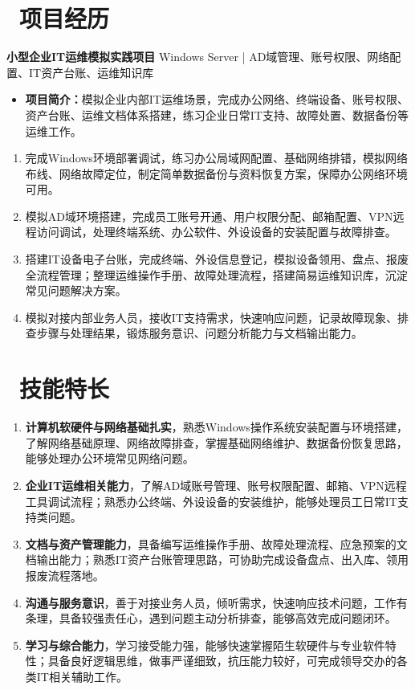 ﻿\documentclass[10pt,a4paper]{ctexart}
\newcommand{\sect}[2]{%
  \section{\texorpdfstring{\makebox[\widthof{\faGraduationCap}][c]{{\mdseries\color{themecolor}#1}}\ #2}{#2}}
}
\begin{document}
\sect{\faFileText}{项目经历}
\textbf{小型企业IT运维模拟实践项目}
Windows Server \quad | \quad AD域管理、账号权限、网络配置、IT资产台账、运维知识库
\begin{itemize}
  \item \textbf{项目简介：}模拟企业内部IT运维场景，完成办公网络、终端设备、账号权限、资产台账、运维文档体系搭建，练习企业日常IT支持、故障处置、数据备份等运维工作。
\end{itemize}
\begin{enumerate}
  \item 完成Windows环境部署调试，练习办公局域网配置、基础网络排错，模拟网络布线、网络故障定位，制定简单数据备份与资料恢复方案，保障办公网络环境可用。
  \item 模拟AD域环境搭建，完成员工账号开通、用户权限分配、邮箱配置、VPN远程访问调试，处理终端系统、办公软件、外设设备的安装配置与故障排查。
  \item 搭建IT设备电子台账，完成终端、外设信息登记，模拟设备领用、盘点、报废全流程管理；整理运维操作手册、故障处理流程，搭建简易运维知识库，沉淀常见问题解决方案。
  \item 模拟对接内部业务人员，接收IT支持需求，快速响应问题，记录故障现象、排查步骤与处理结果，锻炼服务意识、问题分析能力与文档输出能力。
\end{enumerate}

\sect{\faWrench}{技能特长}
\begin{enumerate}
  \item \textbf{计算机软硬件与网络基础扎实}，熟悉Windows操作系统安装配置与环境搭建，了解网络基础原理、网络故障排查，掌握基础网络维护、数据备份恢复思路，能够处理办公环境常见网络问题。
  \item \textbf{企业IT运维相关能力}，了解AD域账号管理、账号权限配置、邮箱、VPN远程工具调试流程；熟悉办公终端、外设设备的安装维护，能够处理员工日常IT支持类问题。
  \item \textbf{文档与资产管理能力}，具备编写运维操作手册、故障处理流程、应急预案的文档输出能力；熟悉IT资产台账管理思路，可协助完成设备盘点、出入库、领用报废流程落地。
  \item \textbf{沟通与服务意识}，善于对接业务人员，倾听需求，快速响应技术问题，工作有条理，具备较强责任心，遇到问题主动分析排查，能够高效完成问题闭环。
  \item \textbf{学习与综合能力}，学习接受能力强，能够快速掌握陌生软硬件与专业软件特性；具备良好逻辑思维，做事严谨细致，抗压能力较好，可完成领导交办的各类IT相关辅助工作。
\end{enumerate}
\end{document}
